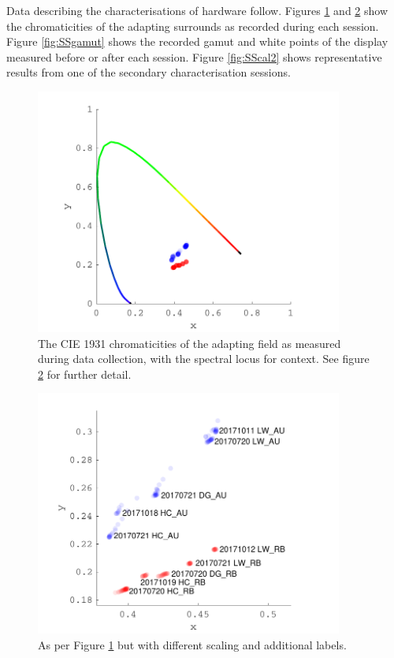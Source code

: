Data describing the characterisations of hardware follow. Figures \ref{fig:SSLEDs} and \ref{fig:SSLEDs2} show the chromaticities of the adapting surrounds as recorded during each session. Figure \ref{fig:SSgamut} shows the recorded gamut and white points of the display measured before or after each session. Figure \ref{fig:SScal2} shows representative results from one of the secondary characterisation sessions.

\begin{figure}[htbp]
\includegraphics[max width=0.9\textwidth,center]{figs/SmallSphere/OOwide.pdf}
\caption{The \gls{CIE} 1931 chromaticities of the adapting field as measured during data collection, with the spectral locus for context. See figure \ref{fig:SSLEDs2} for further detail.}
\label{fig:SSLEDs}
\end{figure}

\begin{figure}[htbp]
\includegraphics[max width=0.9\textwidth,center]{figs/SmallSphere/OO.pdf}
\caption{As per Figure \ref{fig:SSLEDs} but with different scaling and additional labels.}
\label{fig:SSLEDs2}
\end{figure}

